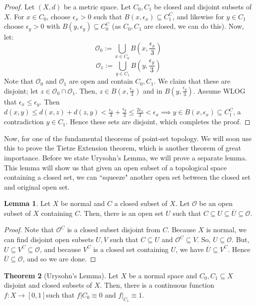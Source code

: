 \documentclass[11pt, oneside]{amsart}   	%
\theoremstyle{definition}
\newtheorem{theorem}{Theorem}[section]
\newtheorem{lemma}[theorem]{Lemma}
\begin{document}
	\begin{proof}
		Let $(X, d)$ be a metric space. Let $C_0, C_1$ be closed and disjoint subsets of $X$. For $x\in C_0$, choose 
		$\epsilon_x > 0$ such that $B(x, \epsilon_x)\subseteq C_1^C$, and likewise for $y\in C_1$ choose $\epsilon_y > 0$ 
		with $B(y, \epsilon_y)\subseteq C_0^C$ (as $C_0, C_1$ are closed, we can do this). Now, let:
		$$
			\mathcal O_0 := \bigcup_{x\in C_0} B(x, \frac{\epsilon_x}{3})
		$$
		$$
			\mathcal O_1 := \bigcup_{y\in C_1} B(y, \frac{\epsilon_y}{3})
		$$
		Note that $\mathcal O_0$ and $\mathcal O_1$ are open and contain $C_0, C_1$. We claim that these are disjoint; 
		let $z\in\mathcal O_0\cap\mathcal O_1$. Then, $z\in B(x, \frac{\epsilon_x}{3})$ and in $B(y, \frac{\epsilon_y}{3})$. 
		Assume WLOG that $\epsilon_x \leq\epsilon_y$. Then $d(x, y)\leq d(x, z) + d(z, y) < \frac{\epsilon_x}{3} + 
		\frac{\epsilon_y}{3} \leq \frac{2\epsilon_x}{3} < \epsilon_x\implies y\in B(x, \epsilon_x)\subseteq C_1^C$, a 
		contradiction $y\in C_1$. Hence these sets are disjoint, which completes the proof.
	\end{proof}
	
	Now, for one of the fundamental theorems of point-set topology. We will soon use this to prove the Tietze Extension 
	theorem, which is another theorem of great importance. Before we state Urysohn's Lemma, we will prove a separate 
	lemma. This lemma will show us that given an open subset of a topological space containing a closed set, we can 
	``squeeze" another open set between the closed set and original open set. 
	
	\begin{lemma}
		Let $X$ be normal and $C$ a closed subset of $X$. Let $\mathcal O$ be an open subset of $X$ containing $C$. 
		Then, there is an open set $U$ such that $C\subseteq U\subseteq\overline U\subseteq\mathcal O$.
	\end{lemma}
	
	\begin{proof}
		Note that $\mathcal O^C$ is a closed subset disjoint from $C$. Because $X$ is normal, we can find disjoint open 
		subsets $U, V$ such that $C\subseteq U$ and $\mathcal O^C\subseteq V$. So, $U\subseteq\mathcal O$. But, $U
		\subseteq V^C\subseteq\mathcal O$, and because $V^C$ is a closed set containing $U$, we have $\overline U
		\subseteq V^C$. Hence $\overline U\subseteq\mathcal O$, and so we are done.
	\end{proof}
	
	\begin{theorem}[Urysohn's Lemma]
		Let $X$ be a normal space and $C_0, C_1\subseteq X$ disjoint and closed subsets of $X$. Then, there is a 
		continuous function $f : X\rightarrow [0, 1]$such that $f|{C_0}\equiv 0$ and $f|_{C_1}\equiv 1$. 
	\end{theorem}
	
\end{document}
